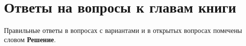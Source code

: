 
﻿\chapter{Ответы на вопросы к главам книги}


Правильные ответы в вопросах с вариантами и в открытых вопросах помечены словом \textbf{Решение}.


% 



% 








